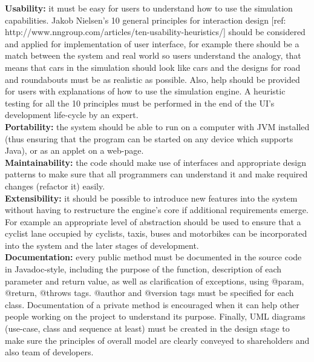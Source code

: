 \documentclass{article}
\begin{document}
\noindent 
\textbf{Usability:} it must be easy for users to understand how to use the simulation capabilities. Jakob Nielsen's 10 general principles for interaction design [ref: http://www.nngroup.com/articles/ten-usability-heuristics/] should be considered and applied for implementation of user interface, for example there should be a match between the system and real world so users understand the analogy, that means that cars in the simulation should look like cars and the designs for road and roundabouts must be as realistic as possible. Also, help should be provided for users with explanations of how to use the simulation engine. A heuristic testing for all the 10 principles must be performed in the end of the UI’s development life-cycle by an expert. \\

\noindent 
\textbf{Portability: }the system should be able to run on a computer with JVM installed (thus ensuring that the program can be started on any device which supports Java), or as an applet on a web-page. \\

\noindent
\textbf{Maintainability:} the code should make use of interfaces and appropriate design patterns to make sure that all programmers can understand it and make required changes (refactor it) easily.\\

\noindent 
\textbf{Extensibility:} it should be possible to introduce new features into the system without having to restructure the engine’s core if additional requirements emerge. For example an appropriate level of abstraction should be used to ensure that a cyclist lane occupied by cyclists, taxis, buses and motorbikes can be incorporated into the system and the later stages of development.\\

\noindent
\textbf{Documentation:} every public method must be documented in the source code in Javadoc-style, including the purpose of the function, description of each parameter and return value, as well as clarification of exceptions, using @param, @return, @throws tags. @author and @version tags must be specified for each class. Documentation of a private method is encouraged when it can help other people working on the project to understand its purpose. Finally, UML diagrams (use-case, class and sequence at least) must be created in the design stage to make sure the principles of overall model are clearly conveyed to shareholders and also team of developers.  
\end{document}
